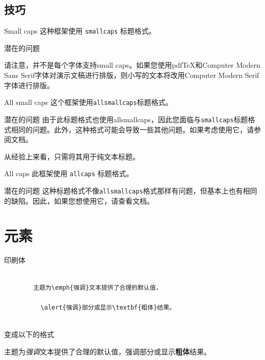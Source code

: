 \documentclass[12pt,aspectratio=169]{beamer}
\begin{document}
\subsection{技巧}

{
    \begin{frame}{Small caps}
      这种框架使用 \texttt{smallcaps} 标题格式。

      \begin{alertblock}{潜在的问题}
        
        请注意，并不是每个字体支持small caps。如果您使用pdfTeX和Computer Modern Sans Serif字体对演示文稿进行排版，则小写的文本将改用Computer Modern Serif字体进行排版。
      
      \end{alertblock}
    \end{frame}
}

{
\begin{frame}{All small caps}
	这个框架使用\texttt{allsmallcaps}标题格式。

	\begin{alertblock}{潜在的问题}
    由于此标题格式也使用allsmallcaps，因此您面临与\texttt{smallcaps}标题格式相同的问题。此外，这种格式可能会导致一些其他问题。如果考虑使用它，请参阅文档。

    从经验上来看，只需将其用于纯文本标题。
	\end{alertblock}
\end{frame}
}

{
\begin{frame}{All caps}
	此框架使用 \texttt{allcaps} 标题格式。

	\begin{alertblock}{潜在的问题}
    这种标题格式不像\texttt{allsmallcaps}格式那样有问题，但基本上也有相同的缺陷。因此，如果您想使用它，请查看文档。
	\end{alertblock}
\end{frame}
}

\section[元素\qquad Elements]{元素}

\begin{frame}[fragile]{印刷体}
      \begin{verbatim}
      
        主题为\emph{强调}文本提供了合理的默认值，
          
          \alert{强调}部分或显示\textbf{粗体}结果。
      
        \end{verbatim}

  \begin{center}变成以下的格式\end{center}

  主题为\emph{强调}文本提供了合理的默认值，\alert{强调}部分或显示\textbf{粗体}结果。
  
\end{frame}
\end{document}
